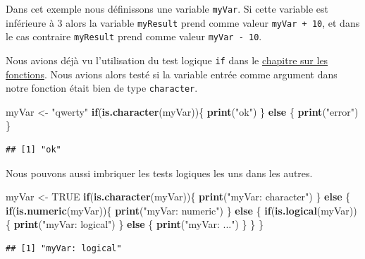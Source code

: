 \documentclass[twoside,symmetric]{book}
\newenvironment{Shaded}{}{}
\newcommand{\ControlFlowTok}[1]{\textbf{#1}}
\newcommand{\KeywordTok}[1]{\textbf{#1}}
\newcommand{\NormalTok}[1]{#1}
\newcommand{\OtherTok}[1]{#1}
\newcommand{\StringTok}[1]{#1}
\begin{document}
Dans cet exemple nous définissons une variable \texttt{myVar}. Si cette variable est inférieure à 3 alors la variable \texttt{myResult} prend comme valeur \texttt{myVar\ +\ 10}, et dans le cas contraire \texttt{myResult} prend comme valeur \texttt{myVar\ -\ 10}.

Nous avions déjà vu l'utilisation du test logique \texttt{if} dans le \protect\hyperlink{l015function}{chapitre sur les fonctions}. Nous avions alors testé si la variable entrée comme argument dans notre fonction était bien de type \texttt{character}.

\begin{Shaded}
\begin{Highlighting}[]
\NormalTok{myVar <-}\StringTok{ "qwerty"}
\ControlFlowTok{if}\NormalTok{(}\KeywordTok{is.character}\NormalTok{(myVar))\{}
  \KeywordTok{print}\NormalTok{(}\StringTok{"ok"}\NormalTok{)}
\NormalTok{\} }\ControlFlowTok{else}\NormalTok{ \{}
  \KeywordTok{print}\NormalTok{(}\StringTok{"error"}\NormalTok{)}
\NormalTok{\}}
\end{Highlighting}
\end{Shaded}

\begin{verbatim}
## [1] "ok"
\end{verbatim}

Nous pouvons aussi imbriquer les tests logiques les uns dans les autres.

\begin{Shaded}
\begin{Highlighting}[]
\NormalTok{myVar <-}\StringTok{ }\OtherTok{TRUE}
\ControlFlowTok{if}\NormalTok{(}\KeywordTok{is.character}\NormalTok{(myVar))\{}
  \KeywordTok{print}\NormalTok{(}\StringTok{"myVar: character"}\NormalTok{)}
\NormalTok{\} }\ControlFlowTok{else}\NormalTok{ \{}
  \ControlFlowTok{if}\NormalTok{(}\KeywordTok{is.numeric}\NormalTok{(myVar))\{}
    \KeywordTok{print}\NormalTok{(}\StringTok{"myVar: numeric"}\NormalTok{)}
\NormalTok{  \} }\ControlFlowTok{else}\NormalTok{ \{}
    \ControlFlowTok{if}\NormalTok{(}\KeywordTok{is.logical}\NormalTok{(myVar))\{}
      \KeywordTok{print}\NormalTok{(}\StringTok{"myVar: logical"}\NormalTok{)}
\NormalTok{    \} }\ControlFlowTok{else}\NormalTok{ \{}
      \KeywordTok{print}\NormalTok{(}\StringTok{"myVar: ..."}\NormalTok{)}
\NormalTok{    \}}
\NormalTok{  \}}
\NormalTok{\}}
\end{Highlighting}
\end{Shaded}

\begin{verbatim}
## [1] "myVar: logical"
\end{verbatim}
\end{document}
